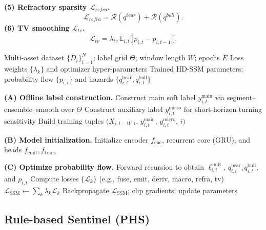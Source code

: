 \documentclass[letterpaper]{article} %
\newcommand{\algsmall}{\footnotesize}
\begin{document}
\textbf{(5) Refractory sparsity $\mathcal{L}_{refra}$.}
\begin{equation}
\mathcal{L}_{refra}=\mathcal{R}(q^{bear})+\mathcal{R}(q^{bull}).
\end{equation}
\textbf{(6) TV smoothing $\mathcal{L}_{tv}$.}
\begin{equation}
\mathcal{L}_{tv}=\lambda_{tv}\,\mathbb{E}_{i,t}\big[|p_{i,t}-p_{i,t-1}|\big].
\end{equation}

\begin{algorithm}[t]
\caption{HD-SSM Training (Soft Labels $\rightarrow$ Probability Flow)}
\label{alg:ssm}
\algsmall
\begin{algorithmic}[1]
\REQUIRE Multi-asset dataset $\{D_i\}_{i=1}^{N}$; label grid $\Theta$; window length $W$; epochs $E$
\REQUIRE Loss weights $\{\lambda_k\}$ and optimizer hyper-parameters
\ENSURE Trained HD-SSM parameters; probability flow $\{p_{i,t}\}$ and hazards $\{q^{\mathrm{bear}}_{i,t},q^{\mathrm{bull}}_{i,t}\}$

\STATE \textbf{(A) Offline label construction.}
  \STATE Construct main soft label $y^{\mathrm{main}}_{i,t}$ via segment--ensemble--smooth over $\Theta$
  \STATE Construct auxiliary label $y^{\mathrm{micro}}_{i,t}$ for short-horizon turning sensitivity
  \STATE Build training tuples $\big(X_{i,t-W:t},\,y^{\mathrm{main}}_{i,t},\,y^{\mathrm{micro}}_{i,t},\,i\big)$
\ENDFOR

\STATE \textbf{(B) Model initialization.}
\STATE Initialize encoder $f_{\mathrm{enc}}$, recurrent core (GRU), and heads $f_{\mathrm{emit}}, f_{\mathrm{trans}}$

\STATE \textbf{(C) Optimize probability flow.}
  \STATE Forward recursion to obtain $\ell^{\mathrm{emit}}_{i,t}$, $q^{\mathrm{bear}}_{i,t},q^{\mathrm{bull}}_{i,t}$, and $p_{i,t}$
  \STATE Compute losses $\{\mathcal{L}_k\}$ (e.g., fuse, emit, deriv, macro, refra, tv)
  \STATE $\mathcal{L}_{\mathrm{SSM}} \gets \sum_k \lambda_k \mathcal{L}_k$
  \STATE Backpropagate $\mathcal{L}_{\mathrm{SSM}}$; clip gradients; update parameters
\ENDFOR
\end{algorithmic}
\end{algorithm}

\subsection{Rule-based Sentinel (PHS)}
\label{sec:phs}
\end{document}
